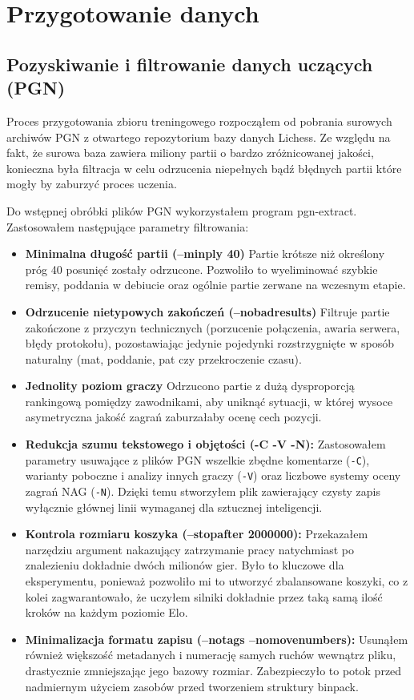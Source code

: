 \documentclass[12pt,a4paper]{report}
\begin{document}
\chapter{Przygotowanie danych}

\section{Pozyskiwanie i filtrowanie danych uczących (PGN)}

Proces przygotowania zbioru treningowego rozpocząłem od pobrania surowych archiwów PGN z otwartego repozytorium bazy danych Lichess. Ze względu na fakt, że surowa baza zawiera miliony partii o bardzo zróżnicowanej jakości, konieczna była filtracja w celu odrzucenia niepełnych bądź błędnych partii które mogły by zaburzyć proces uczenia.

Do wstępnej obróbki plików PGN wykorzystałem program pgn-extract. Zastosowałem następujące parametry filtrowania:

\begin{itemize}
    \item \textbf{Minimalna długość partii (--minply 40)} Partie krótsze niż określony próg 40 posunięć zostały odrzucone. Pozwoliło to wyeliminować szybkie remisy, poddania w debiucie oraz ogólnie partie zerwane na wczesnym etapie.
    \item \textbf{Odrzucenie nietypowych zakończeń (--nobadresults)} Filtruje partie zakończone z przyczyn technicznych (porzucenie połączenia, awaria serwera, błędy protokołu), pozostawiając jedynie pojedynki rozstrzygnięte w sposób naturalny (mat, poddanie, pat czy przekroczenie czasu).
    \item \textbf{Jednolity poziom graczy} Odrzucono partie z dużą dysproporcją rankingową pomiędzy zawodnikami, aby uniknąć sytuacji, w której wysoce asymetryczna jakość zagrań zaburzałaby ocenę cech pozycji.
    \item \textbf{Redukcja szumu tekstowego i objętości (-C -V -N):} Zastosowałem parametry usuwające z plików PGN wszelkie zbędne komentarze (\texttt{-C}), warianty poboczne i analizy innych graczy (\texttt{-V}) oraz liczbowe systemy oceny zagrań NAG (\texttt{-N}). Dzięki temu stworzyłem plik zawierający czysty zapis wyłącznie głównej linii wymaganej dla sztucznej inteligencji.
    \item \textbf{Kontrola rozmiaru koszyka (--stopafter 2000000):} Przekazałem narzędziu argument nakazujący zatrzymanie pracy natychmiast po znalezieniu dokładnie dwóch milionów gier. Było to kluczowe dla eksperymentu, ponieważ pozwoliło mi to utworzyć zbalansowane koszyki, co z kolei zagwarantowało, że uczyłem silniki dokładnie przez taką samą ilość kroków na każdym poziomie Elo.
    \item \textbf{Minimalizacja formatu zapisu (--notags --nomovenumbers):} Usunąłem również większość metadanych i numerację samych ruchów wewnątrz pliku, drastycznie zmniejszając jego bazowy rozmiar. Zabezpieczyło to potok przed nadmiernym użyciem zasobów przed tworzeniem struktury binpack.
\end{itemize}
\end{document}
